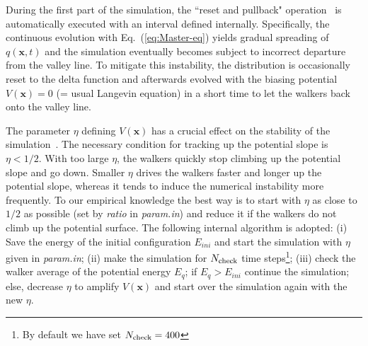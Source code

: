 \documentclass[preprint,12pt]{elsarticle}
\begin{document}
During the first part of the simulation, the ``reset and pullback" operation~\cite{Nagornov} is automatically executed with an interval defined internally. Specifically, the continuous evolution with Eq.~(\ref{eq:Master-eq}) yields gradual spreading of $q({\bm x}, t)$ and the simulation eventually becomes subject to incorrect departure from the valley line. To mitigate this instability, the distribution is occasionally reset to the delta function and afterwards evolved with the biasing potential $V({\bm x})=0$ (= usual Langevin equation) in a short time to let the walkers back onto the valley line. 

The parameter $\eta$ defining $V({\bm x})$ has a crucial effect on the stability of the simulation~\cite{Akashi, Nagornov}. The necessary condition for tracking up the potential slope is $\eta<1/2$. With too large $\eta$, the walkers quickly stop climbing up the potential slope and go down. Smaller $\eta$ drives the walkers faster and longer up the potential slope, whereas it tends to induce the numerical instability more frequently. To our empirical knowledge the best way is to start with $\eta$ as close to $1/2$ as possible (set by {\it ratio} in {\it param.in}) and reduce it if the walkers do not climb up the potential surface. The following internal algorithm is adopted: (i) Save the energy of the initial configuration $E_{ini}$ and start the simulation with $\eta$ given in {\it param.in}; (ii) make the simulation for $N_{\rm check}$ time steps\footnote{By default we have set $N_{\rm check}=400$}; (iii) check the walker average of the potential energy $E_{q}$; if $E_{q} > E_{ini}$ continue the simulation; else, decrease  $\eta$ to amplify $V({\bm x})$ and start over the simulation again with the new $\eta$.

\end{document}
